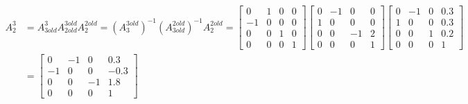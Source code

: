 \documentclass[twoside,11pt]{homework}
\begin{document}
%
\begin{equation}
\begin{split}
A_2^3 &= A_{3old}^3 A_{2old}^{3old} A_2^{2old} =(A_3^{3old})^{-1} (A_{3old}^{2old})^{-1} A_2^{2old} = 
\begin{bmatrix}
0 & 1 & 0 & 0 \\
-1 & 0 & 0 & 0 \\
0 & 0 & 1 & 0 \\
0 & 0 & 0 & 1 
\end{bmatrix}
\begin{bmatrix}
0 & -1 & 0 & 0 \\
1 & 0 & 0 & 0 \\
0 & 0 & -1 & 2 \\
0 & 0 & 0 & 1 
\end{bmatrix}
\begin{bmatrix}
0 & -1 & 0 & 0.3 \\
1 & 0 & 0 & 0.3 \\
0 & 0 & 1 & 0.2 \\
0 & 0 & 0 & 1
\end{bmatrix} \\
&= \begin{bmatrix}
0 & -1 & 0 & 0.3 \\
-1 & 0 & 0 & -0.3 \\
0 & 0 & -1 & 1.8 \\
0 & 0 & 0 & 1
\end{bmatrix} 
\end{split}
\end{equation}



\end{document}
